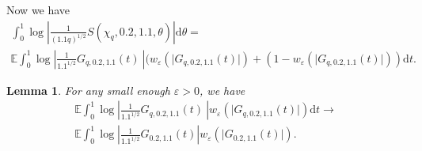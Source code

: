 \documentclass[12pt, a4paper]{amsart}
\newtheorem{lemma}{Lemma}
\theoremstyle{remark}
\newcommand{\ud}{\mathrm{d}}
\newcommand{\abs}[1]{\left|#1\right|}
\begin{document}
Now we have 
\begin{multline}\label{eq:smallandlarge}
     \int_0^1 \log\abs{ \frac{1}{(1.1q)^{1/2}} S(\chi_q, 0.2, 1.1, \theta)}\ud\theta = \\  \mathbb E \int_0^1 \log\left\lvert\frac{1}{1.1^{1/2}}G_{q, 0.2, 1.1}(t)\ \right\rvert(w_{\varepsilon}(\lvert G_{q, 0.2, 1.1}(t)\rvert) + (1-w_{\varepsilon}(\lvert G_{q, 0.2, 1.1}(t)\rvert))\ud t.
\end{multline} 

\begin{lemma}\label{lemma:logLarge}
    For any small enough $\varepsilon>0$, we have 
    \begin{multline*}
        \mathbb E \int_0^1 \log\left\lvert\frac{1}{1.1^{1/2}}G_{q, 0.2, 1.1}(t)\ \right\rvert w_{\varepsilon}(\lvert G_{q, 0.2, 1.1}(t)\rvert)\ud t\longrightarrow \\  \mathbb E\int_0^1 \log \abs{\frac{1}{1.1^{1/2}} G_{0.2, 1.1}(t)}w_{\varepsilon}(\lvert G_{0.2, 1.1}(t)\rvert).
    \end{multline*}
\end{lemma}
\end{document}
